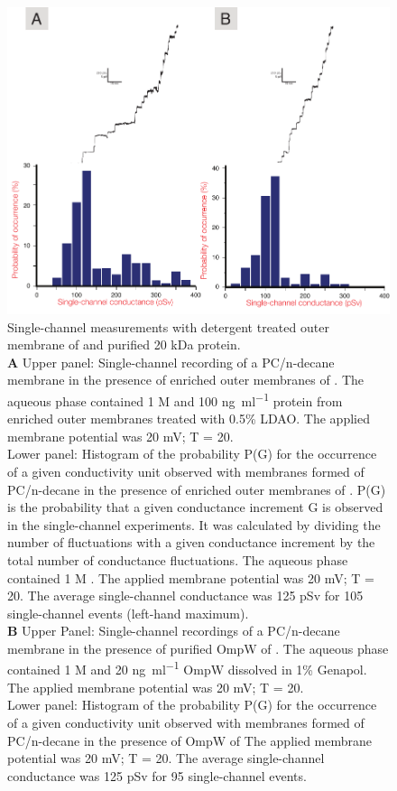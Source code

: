 \begin{figure}[p]
  	\begin{center}
   		\includegraphics[width=0.8\textwidth{}]{porin_chapter/img/Fig2-singleconductances.pdf}
   	\end{center}
   	\caption[Single-channel measurements with detergent treated outer membrane of C. crescentus and purified 20 kDa protein]{
Single-channel measurements with detergent treated outer membrane of \caulobacter and purified 20 kDa protein.\\
\textbf{A} Upper panel: Single-channel recording of a PC/n-decane membrane in the presence of enriched outer membranes of \caulobacter. The aqueous phase contained 1 M  and 100 \si{\nano\gram\per\milli\litre} protein from enriched outer membranes treated with 0.5\% \ac{LDAO}. The applied membrane potential was 20 \si{\milli\volt}; T = 20\cel.\\
Lower panel: Histogram of the probability P(G) for the occurrence of a given conductivity unit observed with membranes formed of \ac{PC}/n-decane in the presence of enriched outer membranes of \caulobacter. P(G) is the probability that a given conductance increment G is observed in the single-channel experiments. It was calculated by dividing the number of fluctuations with a given conductance increment by the total number of conductance fluctuations. The aqueous phase contained 1 M . The applied membrane potential was 20 \si{\milli\volt}; T = 20\cel. The average single-channel conductance was 125 \si{\pico\sievert} for 105 single-channel events (left-hand maximum). \\
\textbf{B} Upper Panel: Single-channel recordings of a \ac{PC}/n-decane membrane in the presence of purified OmpW of \caulobacter. The aqueous phase contained 1 M  and 20 \si{\nano\gram\per\milli\litre} OmpW dissolved in 1\% Genapol. The applied membrane potential was 20 \si{\milli\volt}; T = 20\cel. \\
Lower panel: Histogram of the probability P(G) for the occurrence of a given conductivity unit observed with membranes formed of \ac{PC}/n-decane in the presence of OmpW of \caulobacter The applied membrane potential was 20 \si{\milli\volt}; T = 20\cel. The average single-channel conductance was 125 \si{\pico\sievert} for 95 single-channel events.
   	}
   	\label{fig:porin-20ksinglechannel}
\end{figure}   


